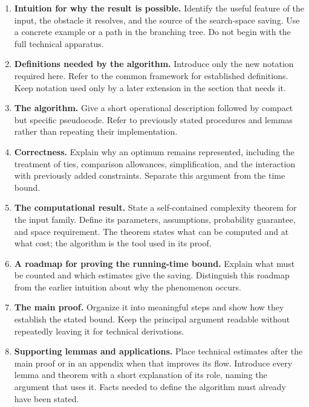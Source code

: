 \documentclass[11pt,a4paper]{article}
\begin{document}
\begin{enumerate}
\item \textbf{Intuition for why the result is possible.}
Identify the useful feature of the input, the obstacle it resolves, and
the source of the search-space saving. Use a concrete example or a path
in the branching tree. Do not begin with the full technical apparatus.

\item \textbf{Definitions needed by the algorithm.}
Introduce only the new notation required here. Refer to the common
framework for established definitions. Keep notation used only by a
later extension in the section that needs it.

\item \textbf{The algorithm.}
Give a short operational description followed by compact but specific
pseudocode. Refer to previously stated procedures and lemmas rather
than repeating their implementation.

\item \textbf{Correctness.}
Explain why an optimum remains represented, including the treatment of
ties, comparison allowances, simplification, and the interaction with
previously added constraints. Separate this argument from the time bound.

\item \textbf{The computational result.}
State a self-contained complexity theorem for the input family. Define
its parameters, assumptions, probability guarantee, and space requirement.
The theorem states what can be computed and at what cost; the algorithm
is the tool used in its proof.

\item \textbf{A roadmap for proving the running-time bound.}
Explain what must be counted and which estimates give the saving.
Distinguish this roadmap from the earlier intuition about why the
phenomenon occurs.

\item \textbf{The main proof.}
Organize it into meaningful steps and show how they establish the stated
bound. Keep the principal argument readable without repeatedly leaving
it for technical derivations.

\item \textbf{Supporting lemmas and applications.}
Place technical estimates after the main proof or in an appendix when
that improves its flow. Introduce every lemma and theorem with a short
explanation of its role, naming the argument that uses it. Facts needed
to define the algorithm must already have been stated.
\end{enumerate}
\end{document}
